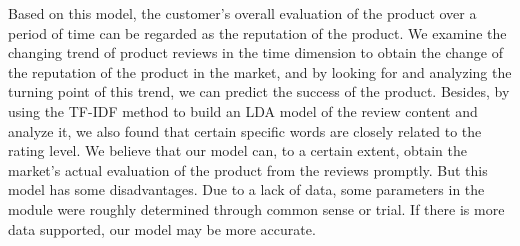 \documentclass{mcmthesis}
\begin{document}
Based on this model, the customer's overall evaluation of the product over a period of time can be regarded as the reputation of the product. We examine the changing trend of product reviews in the time dimension to obtain the change of the reputation of the product in the market, and by looking for and analyzing the turning point of this trend, we can predict the success of the product. Besides, by using the TF-IDF method to build an LDA model of the review content and analyze it, we also found that certain specific words are closely related to the rating level.
We believe that our model can, to a certain extent, obtain the market's actual evaluation of the product from the reviews promptly. But this model has some disadvantages. Due to a lack of data, some parameters in the module were roughly determined through common sense or trial. If there is more data supported, our model may be more accurate.


\clearpage
\pagestyle{fancy}
\newpage
\setcounter{page}{1}

\tableofcontents
\newpage
\end{document}
